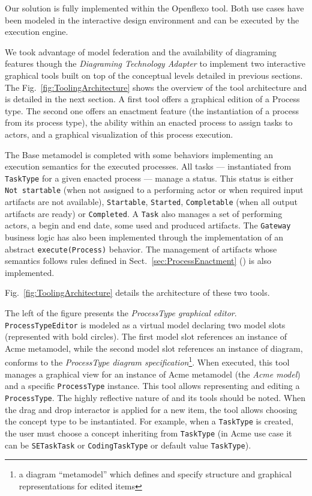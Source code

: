 Our solution is fully implemented within the Openflexo tool. Both use cases
have been modeled in the interactive design environment and can be executed by
the \FML execution engine.


We took advantage of model federation and the availability of diagraming
features though the \textit{Diagraming Technology Adapter} to implement two
interactive graphical tools built on top of the conceptual levels detailed in
previous sections. The Fig.~\ref{fig:ToolingArchitecture} shows the overview of
the tool architecture and is detailed in the next section. A first tool offers
a graphical edition of a Process type. The second one offers an enactment
feature (the instantiation of a process from its process type), the ability
within an enacted process to assign tasks to actors, and a graphical
visualization of this process execution.


The Base metamodel is completed with some behaviors implementing an execution
semantics for the executed processes. All tasks --- instantiated from
\texttt{TaskType} for a given enacted process --- manage a status. This status
is either \texttt{Not startable} (when not assigned to a performing actor or
when required input artifacts are not available), \texttt{Startable},
\texttt{Started}, \texttt{Completable} (when all output artifacts are ready) or
\texttt{Completed}. A \texttt{Task} also manages a set of performing actors, a
begin and end date, some used and produced artifacts. The \texttt{Gateway}
business logic has also been implemented through the implementation of an
abstract \texttt{execute(Process)} behavior. The management of artifacts whose
semantics follows rules defined in Sect.~\ref{sec:ProcessEnactment}
() is also implemented.

Fig.~\ref{fig:ToolingArchitecture} details the architecture of these two tools.

The left of the figure presents the \textit{ProcessType graphical editor}.
\texttt{ProcessTypeEditor} is modeled as a virtual model declaring two model
slots (represented with bold circles). The first model slot references an
instance of Acme metamodel, while the second model slot references an instance
of diagram, conforms to the \textit{ProcessType diagram
specification}\footnote{a diagram \enquote{metamodel} which defines and specify
structure and graphical representations for edited items}. When executed, this
tool manages a graphical view for an instance of Acme metamodel (the
\textit{Acme model}) and a specific \texttt{ProcessType} instance. This tool
allows representing and editing a \texttt{ProcessType}. The highly reflective
nature of \FML and its tools should be noted. When the drag and drop
interactor is applied for a new item, the tool allows choosing the concept type
to be instantiated. For example, when a \texttt{TaskType} is created, the user
must choose a concept inheriting from \texttt{TaskType} (in Acme use case it
can be \texttt{SETaskTask} or \texttt{CodingTaskType} or default value
\texttt{TaskType}).


